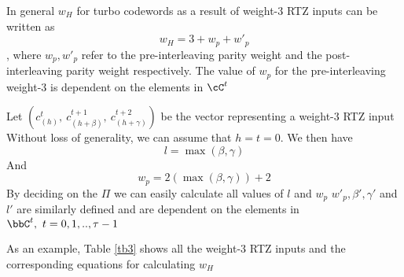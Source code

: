 \documentclass[11pt, oneside, dvipdfmx]{book}
\begin{document}
In general $w_H$ for turbo codewords as a result of weight-$3$ RTZ inputs can be written as $$w_H=3 + w_p+ w'_p$$, where $w_p,w'_p$ refer to the pre-interleaving parity weight and the post-interleaving parity weight respectively. The value of $w_p$ for the pre-interleaving weight-$3$ is dependent on the elements in $\cC^t$

Let $(c_{(h)}^{t},~c_{(h+\beta)}^{t+1},~c_{(h+\gamma)}^{t+2})$ be the vector representing a weight-$3$ RTZ input
Without loss of generality, we can assume that $h =t =0$. We then have 
\begin{equation}
l=\max{(\beta,\gamma)}
\label{eq8}
\end{equation}
And 
\begin{equation}
w_p=
2(\max{(\beta,\gamma)})+2
\label{eq9}
\end{equation}
By deciding on the $\Pi$ we can easily calculate all values of $l$ and $w_p$
$w'_p,\beta',\gamma' $ and $l'$ are similarly defined and are dependent on the elements in $\bbC^{t},~t=0,1,..,\tau-1$

As an example, Table \ref{tb3} shows all the weight-$3$ RTZ inputs and the corresponding equations for calculating $w_H$
\end{document}
